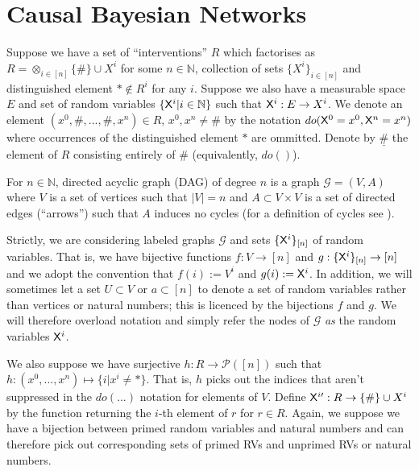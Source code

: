 
\section{Causal Bayesian Networks}

Suppose we have a set of ``interventions'' $R$ which factorises as $R=\otimes_{i\in [n]} \{\#\}\cup X^i$ for some $n\in \mathbb{N}$, collection of sets $\{X^i\}_{i\in [n]}$ and distinguished element $*\not\in R^i$ for any $i$. Suppose we also have a measurable space $E$ and set of random variables $\{\mathsf{X}^i|i\in \mathbb{N}\}$ such that $\mathsf{X}^i:E\to X^i$. We denote an element $(x^0,\#,...,\#,x^n)\in R$, $x^0,x^n\neq \#$ by the notation $do(\mathsf{X}^0=x^0,\mathsf{X}^n=x^n)$ where occurrences of the distinguished element $*$ are ommitted. Denote by $\underline{\#}$ the element of $R$ consisting entirely of $\#$ (equivalently, $do()$).

For $n\in \mathbb{N}$, directed acyclic graph (DAG) of degree $n$ is a graph $\mathcal{G}=(V,A)$ where $V$ is a set of vertices such that $|V|=n$ and $A\subset V\times V$ is a set of directed edges (``arrows'') such that $A$ induces no cycles (for a definition of cycles see \citet{pearl_causality:_2009}). 

Strictly, we are considering labeled graphs $\mathcal{G}$ and sets $\{\mathsf{X}^i\}_{[n]}$ of random variables. That is, we have bijective functions $f:V\to [n]$ and $g:\{\mathsf{X}^i\}_{[n]}\to [n]$ and we adopt the convention that $f(i):=V^i$ and $g(i):=\mathsf{X}^i$. In addition, we will sometimes let a set $U\subset V$ or $a\subset[n]$ to denote a set of random variables rather than vertices or natural numbers; this is licenced by the bijections $f$ and $g$. We will therefore overload notation and simply refer the nodes of $\mathcal{G}$ \emph{as} the random variables $\mathsf{X}^i$.

We also suppose we have surjective $h:R\to \mathscr{P}([n])$ such that $h:(x^0,...,x^n)\mapsto \{i|x^i\neq *\}$. That is, $h$ picks out the indices that aren't suppressed in the $do(...)$ notation for elements of $V$. Define $\mathsf{X}^{i\prime}:R\to \{\#\}\cup X^i$ by the function returning the $i$-th element of $r$ for $r\in R$. Again, we suppose we have a bijection between primed random variables and natural numbers and can therefore pick out corresponding sets of primed RVs and unprimed RVs or natural numbers.

